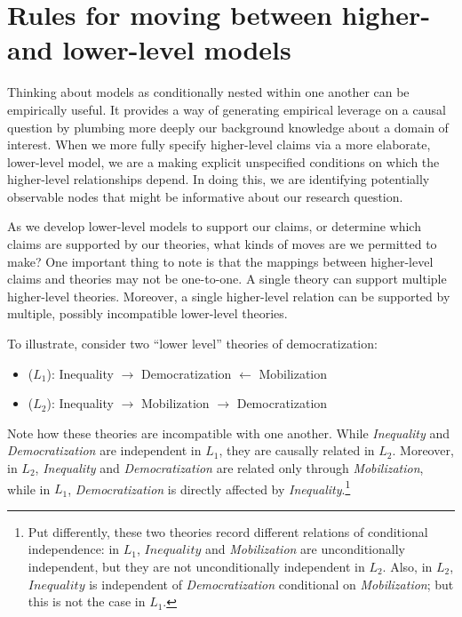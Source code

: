 \documentclass[
  12pt,
]{book}
\providecommand{\tightlist}{%
  \setlength{\itemsep}{0pt}\setlength{\parskip}{0pt}}
\begin{document}
\hypertarget{rules-for-moving-between-higher--and-lower-level-models}{%
\section{Rules for moving between higher- and lower-level models}\label{rules-for-moving-between-higher--and-lower-level-models}}

Thinking about models as conditionally nested within one another can be empirically useful. It provides a way of generating empirical leverage on a causal question by plumbing more deeply our background knowledge about a domain of interest. When we more fully specify higher-level claims via a more elaborate, lower-level model, we are a making explicit unspecified conditions on which the higher-level relationships depend. In doing this, we are identifying potentially observable nodes that might be informative about our research question.

As we develop lower-level models to support our claims, or determine which claims are supported by our theories, what kinds of moves are we permitted to make? One important thing to note is that the mappings between higher-level claims and theories may not be one-to-one. A single theory can support multiple higher-level theories. Moreover, a single higher-level relation can be supported by multiple, possibly incompatible lower-level theories.

To illustrate, consider two ``lower level'' theories of democratization:

\begin{itemize}
\tightlist
\item
  (\(L_1\)): Inequality \(\rightarrow\) Democratization \(\leftarrow\) Mobilization\\
\item
  (\(L_2\)): Inequality \(\rightarrow\) Mobilization \(\rightarrow\) Democratization
\end{itemize}

Note how these theories are incompatible with one another. While \emph{Inequality} and \emph{Democratization} are independent in \(L_1\), they are causally related in \(L_2\). Moreover, in \(L_2\), \emph{Inequality} and \emph{Democratization} are related only through \emph{Mobilization}, while in \(L_1\), \emph{Democratization} is directly affected by \emph{Inequality}.\footnote{Put differently, these two theories record different relations of conditional independence: in \(L_1\), \(Inequality\) and \emph{Mobilization} are unconditionally independent, but they are not unconditionally independent in \(L_2\). Also, in \(L_2\), \(Inequality\) is independent of \emph{Democratization} conditional on \emph{Mobilization}; but this is not the case in \(L_1\).}
\end{document}
